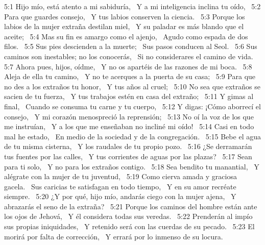 5:1 Hijo mío, está atento a mi sabiduría,  
Y a mi inteligencia inclina tu oído,  
5:2 Para que guardes consejo,  
Y tus labios conserven la ciencia.  
5:3 Porque los labios de la mujer extraña destilan miel,  
Y su paladar es más blando que el aceite;  
5:4 Mas su fin es amargo como el ajenjo,  
Agudo como espada de dos filos.  
5:5 Sus pies descienden a la muerte;  
Sus pasos conducen al Seol.  
5:6 Sus caminos son inestables; no los conocerás,  
Si no considerares el camino de vida.  
5:7 Ahora pues, hijos, oídme,  
Y no os apartéis de las razones de mi boca.  
5:8 Aleja de ella tu camino,  
Y no te acerques a la puerta de su casa;  
5:9 Para que no des a los extraños tu honor,  
Y tus años al cruel;  
5:10 No sea que extraños se sacien de tu fuerza,  
Y tus trabajos estén en casa del extraño;  
5:11 Y gimas al final,  
Cuando se consuma tu carne y tu cuerpo,  
5:12 Y digas: ¡Cómo aborrecí el consejo,  
Y mi corazón menospreció la reprensión;  
5:13 No oí la voz de los que me instruían,  
Y a los que me enseñaban no incliné mi oído!  
5:14 Casi en todo mal he estado,  
En medio de la sociedad y de la congregación.  
5:15 Bebe el agua de tu misma cisterna,  
Y los raudales de tu propio pozo.  
5:16 ¿Se derramarán tus fuentes por las calles,  
Y tus corrientes de aguas por las plazas?  
5:17 Sean para ti solo,  
Y no para los extraños contigo.  
5:18 Sea bendito tu manantial,  
Y alégrate con la mujer de tu juventud,  
5:19 Como cierva amada y graciosa gacela.  
Sus caricias te satisfagan en todo tiempo,  
Y en su amor recréate siempre.  
5:20 ¿Y por qué, hijo mío, andarás ciego con la mujer ajena,  
Y abrazarás el seno de la extraña?  
5:21 Porque los caminos del hombre están ante los ojos de Jehová,  
Y él considera todas sus veredas.  
5:22 Prenderán al impío sus propias iniquidades,  
Y retenido será con las cuerdas de su pecado.  
5:23 El morirá por falta de corrección,  
Y errará por lo inmenso de su locura.  
